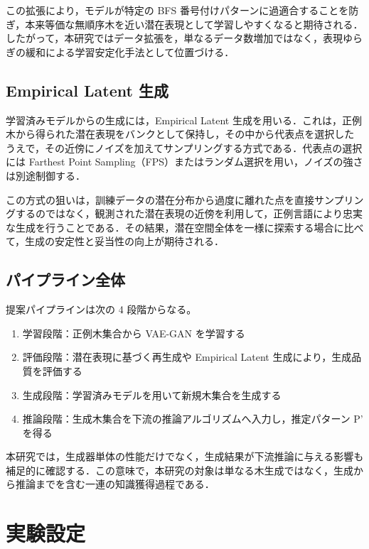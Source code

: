 \documentclass[submit,techrep,noauthor]{ipsj}
\begin{document}
この拡張により，モデルが特定の BFS 番号付けパターンに過適合することを防ぎ，本来等価な無順序木を近い潜在表現として学習しやすくなると期待される．したがって，本研究ではデータ拡張を，単なるデータ数増加ではなく，表現ゆらぎの緩和による学習安定化手法として位置づける．

\subsection{Empirical Latent 生成}

学習済みモデルからの生成には，Empirical Latent 生成を用いる．これは，正例木から得られた潜在表現をバンクとして保持し，その中から代表点を選択したうえで，その近傍にノイズを加えてサンプリングする方式である．代表点の選択には Farthest Point Sampling（FPS）またはランダム選択を用い，ノイズの強さは別途制御する．

この方式の狙いは，訓練データの潜在分布から過度に離れた点を直接サンプリングするのではなく，観測された潜在表現の近傍を利用して，正例言語により忠実な生成を行うことである．その結果，潜在空間全体を一様に探索する場合に比べて，生成の安定性と妥当性の向上が期待される．

\subsection{パイプライン全体}

提案パイプラインは次の 4 段階からなる。
\begin{enumerate}
\item 学習段階：正例木集合から VAE-GAN を学習する
\item 評価段階：潜在表現に基づく再生成や Empirical Latent 生成により，生成品質を評価する
\item 生成段階：学習済みモデルを用いて新規木集合を生成する
\item 推論段階：生成木集合を下流の推論アルゴリズムへ入力し，推定パターン P' を得る
\end{enumerate}

本研究では，生成器単体の性能だけでなく，生成結果が下流推論に与える影響も補足的に確認する．この意味で，本研究の対象は単なる木生成ではなく，生成から推論までを含む一連の知識獲得過程である．

\section{実験設定}

\end{document}
